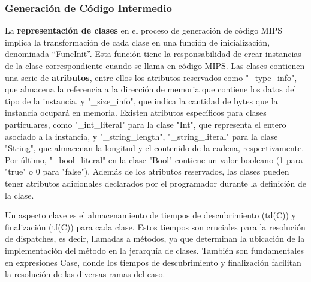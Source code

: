 \documentclass[10pt]{article} %
\begin{document}
%
%	
%	
%	
%	
	
	\subsubsection{Generaci\'on de C\'odigo Intermedio}
	
	La \textbf{representación de clases} en el proceso de generación de código MIPS implica la transformación de cada clase en una función de inicialización, denominada ``FuncInit''. Esta función tiene la responsabilidad de crear instancias de la clase correspondiente cuando se llama en código MIPS. Las clases contienen una serie de \textbf{atributos}, entre ellos los atributos reservados como "\_type\_info", que almacena la referencia a la dirección de memoria que contiene los datos del tipo de la instancia, y "\_size\_info", que indica la cantidad de bytes que la instancia ocupará en memoria. Existen atributos específicos para clases particulares, como "\_int\_literal" para la clase "Int", que representa el entero asociado a la instancia, y "\_string\_length", "\_string\_literal" para la clase "String", que almacenan la longitud y el contenido de la cadena, respectivamente. Por último, "\_bool\_literal" en la clase "Bool" contiene un valor booleano (1 para "true" o 0 para "false"). Además de los atributos reservados, las clases pueden tener atributos adicionales declarados por el programador durante la definición de la clase.
	
	Un aspecto clave es el almacenamiento de tiempos de descubrimiento (td(C)) y finalización (tf(C)) para cada clase. Estos tiempos son cruciales para la resolución de dispatches, es decir, llamadas a métodos, ya que determinan la ubicación de la implementación del método en la jerarquía de clases. También son fundamentales en expresiones Case, donde los tiempos de descubrimiento y finalización facilitan la resolución de las diversas ramas del caso. 
	
\end{document}
